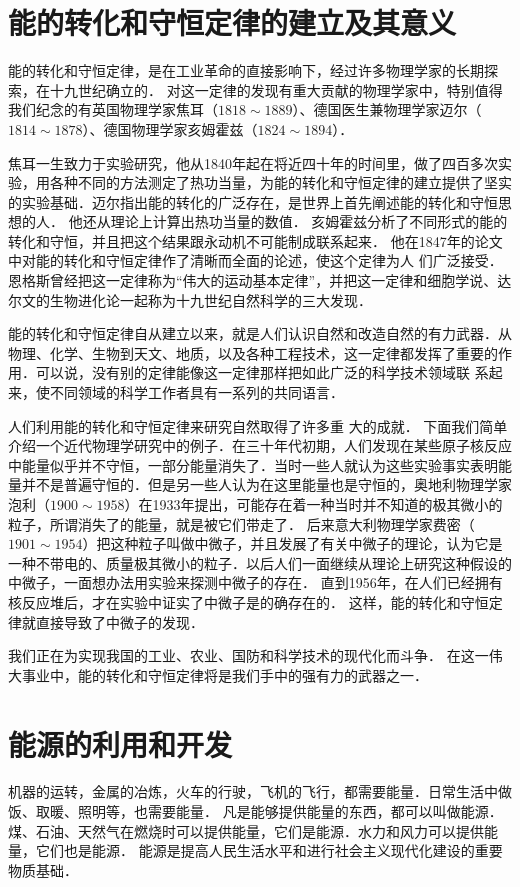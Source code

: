 \section{能的转化和守恒定律的建立及其意义}
能的转化和守恒定律，是在工业革命的直接影响下，经过许多物理学家的长期探索，在十九世纪确立的．
对这一定律的发现有重大贡献的物理学家中，特别值得我们纪念的有英国物理学家焦耳（$1818 \sim 1889$）、德国医生兼物理学家迈尔（$1814 \sim 1878$）、德国物理学家亥姆霍兹（$1824 \sim 1894$）．

焦耳一生致力于实验研究，他从1840年起在将近四十年的时间里，做了四百多次实验，用各种不同的方法测定了热功当量，为能的转化和守恒定律的建立提供了坚实的实验基础．迈尔指出能的转化的广泛存在，是世界上首先阐述能的转化和守恒思想的人．
他还从理论上计算出热功当量的数值．
亥姆霍兹分析了不同形式的能的转化和守恒，并且把这个结果跟永动机不可能制成联系起来．
他在1847年的论文中对能的转化和守恒定律作了清晰而全面的论述，使这个定律为人
们广泛接受．恩格斯曾经把这一定律称为“伟大的运动基本定律”，并把这一定律和细胞学说、达尔文的生物进化论一起称为十九世纪自然科学的三大发现．

能的转化和守恒定律自从建立以来，就是人们认识自然和改造自然的有力武器．从物理、化学、生物到天文、地质，以及各种工程技术，这一定律都发挥了重要的作用．可以说，没有别的定律能像这一定律那样把如此广泛的科学技术领域联
系起来，使不同领域的科学工作者具有一系列的共同语言．

人们利用能的转化和守恒定律来研究自然取得了许多重
大的成就．
下面我们简单介绍一个近代物理学研究中的例子．在三十年代初期，人们发现在某些原子核反应中能量似乎并不守恒，一部分能量消失了．当时一些人就认为这些实验事实表明能量并不是普遍守恒的．但是另一些人认为在这里能量也是守恒的，奥地利物理学家泡利（$1900 \sim 1958$）在1933年提出，可能存在着一种当时并不知道的极其微小的粒子，所谓消失了的能量，就是被它们带走了．
后来意大利物理学家费密（$1901 \sim 1954$）把这种粒子叫做中微子，并且发展了有关中微子的理论，认为它是一种不带电的、质量极其微小的粒子．以后人们一面继续从理论上研究这种假设的中微子，一面想办法用实验来探测中微子的存在．
直到1956年，在人们已经拥有核反应堆后，才在实验中证实了中微子是的确存在的．
这样，能的转化和守恒定律就直接导致了中微子的发现．

我们正在为实现我国的工业、农业、国防和科学技术的现代化而斗争．
在这一伟大事业中，能的转化和守恒定律将是我们手中的强有力的武器之一．

\section{能源的利用和开发}
机器的运转，金属的冶炼，火车的行驶，飞机的飞行，都需要能量．日常生活中做饭、取暖、照明等，也需要能量．
凡是能够提供能量的东西，都可以叫做能源．煤、石油、天然气在燃烧时可以提供能量，它们是能源．水力和风力可以提供能
量，它们也是能源．
能源是提高人民生活水平和进行社会主义现代化建设的重要物质基础．

